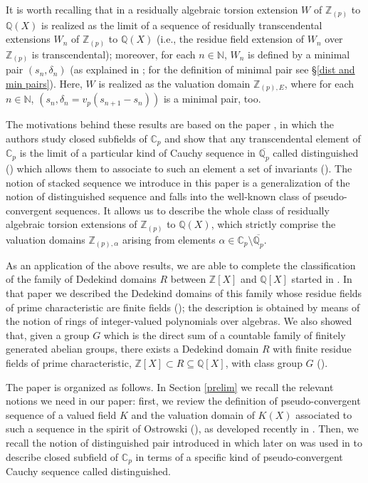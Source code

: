 \documentclass[10pt]{article}
\numberwithin{equation}{section}
\theoremstyle{definition}\newtheorem{Def}[equation]{Definition}
\theoremstyle{definition}\newtheorem{Ques}[equation]{Question}
\newcommand{\Q}{\mathbb{Q}}
\newcommand{\N}{\mathbb{N}}
\newcommand{\Z}{\mathbb{Z}}
\newcommand{\C}{\mathbb{C}}
\newcommand{\oQp}{\overline{\Q_p}}
\begin{document}
It is worth recalling that in \cite[\S 5, 1., \& Theorem 5.1]{APZAll} a residually algebraic torsion extension $W$ of $\Z_{(p)}$ to $\Q(X)$ is realized as the limit of a sequence of residually transcendental extensions $W_n$ of $\Z_{(p)}$ to $\Q(X)$ (i.e., the residue field extension of $W_n$ over $\Z_{(p)}$ is transcendental); moreover, for each $n\in\N$, $W_n$ is defined by a minimal pair $(s_n,\delta_n)$ (as explained in \cite[p. 282]{APZAll}; for the definition of minimal pair see \S \ref{dist and min pairs}). Here, $W$ is realized as the valuation domain $\Z_{(p),E}$, where for each $n\in\N$, $(s_n,\delta_n=v_p(s_{n+1}-s_n))$ is a minimal pair, too.

The motivations behind these results are based on the paper \cite{APZclosed}, in which the authors study closed subfields of $\C_p$ and show that any transcendental element of $\C_p$ is the limit of a particular kind of Cauchy sequence in $\oQp$ called distinguished (\cite[Proposition 2.2]{APZclosed}) which allows them to associate to such an element a set of invariants (\cite[Remark 2.4]{APZclosed}). The notion of stacked sequence we introduce in this paper is a generalization of the notion of distinguished sequence and falls into the well-known class of pseudo-convergent sequences. It allows us to describe the whole class of residually algebraic torsion extensions of $\Z_{(p)}$ to $\Q(X)$, which strictly comprise the valuation domains $\Z_{(p),\alpha}$ arising from elements $\alpha\in\C_p\setminus\oQp$.

As an application of the above results, we are able to complete the classification of the family of Dedekind domains $R$ between $\Z[X]$ and $\Q[X]$ started in \cite{PerDedekind}. In that paper we described the Dedekind domains of this family whose residue fields of prime characteristic are finite fields (\cite[Theorem 2.17]{PerDedekind}); the description is obtained by means of the notion of rings of integer-valued polynomials over algebras. We also showed that, given a group $G$ which is the direct sum of a countable family of finitely generated abelian groups, there exists a Dedekind domain $R$ with finite residue fields of prime characteristic, $\Z[X]\subset R\subseteq\Q[X]$, with class group $G$ (\cite[Theorem 3.1]{PerDedekind}).  


The paper is organized as follows. In Section \ref{prelim} we recall the relevant notions we need in our paper: first, we review the definition of pseudo-convergent sequence of a valued field $K$ and the valuation domain of $K(X)$ associated to such a sequence in the spirit of Ostrowski (\cite{Ostr}), as developed recently in \cite{PS1,PS2}. Then, we recall the notion of distinguished pair introduced in \cite{PZstructure} which later on was used in \cite{APZclosed} to describe closed subfield of $\C_p$ in terms of a specific kind of pseudo-convergent Cauchy sequence called distinguished.
\end{document}
